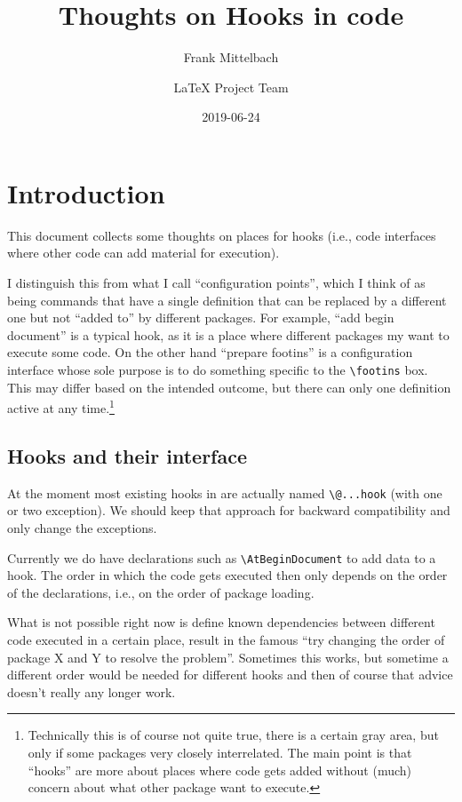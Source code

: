\documentclass{article}
\title{Thoughts on Hooks in code}
\author{Frank Mittelbach \and
  \LaTeX{} Project Team}
\date{2019-06-24}
\newcounter{hook}
\newcounter{config}
\newcommand\cs[1]{\texttt{\textbackslash #1}}
\begin{document}
\maketitle

\tableofcontents

\section{Introduction}


This document collects some thoughts on places for hooks (i.e., code
interfaces where other code can add material for execution).

I distinguish this from what I call  ``configuration points'', which I think of as
being commands that have a single definition that can be replaced by a
different one but not ``added to'' by different packages. For example,
``add begin document'' is a typical hook, as it is a place where
different packages my want to execute some code. On the other hand
``prepare footins'' is a configuration interface whose sole purpose is
to do something specific to the \cs{footins} box. This may differ
based on the intended outcome, but there can only one definition active at any
time.\footnote{Technically this is of course not quite true, there is
  a certain gray area, but only if some packages very closely
  interrelated. The main point is that ``hooks'' are more about places
  where code gets added without (much) concern about what other
  package want to execute.}


\subsection{Hooks and their interface}

At the moment most existing hooks in \LaTeXe{} are actually named
\cs{@...hook} (with one or two exception). We should keep that
approach for backward compatibility and only change the exceptions.

Currently we do have declarations such as \cs{AtBeginDocument} to add
data to a hook.  The order in which the code gets executed then only
depends on the order of the declarations, i.e., on the order of
package loading.

What is not possible right now is define known dependencies between
different code executed in a certain place, result in the famous ``try
changing the order of package X and Y to resolve the
problem''. Sometimes this works, but sometime a different order would
be needed for different hooks and then of course that advice doesn't
really any longer work.
\end{document}

